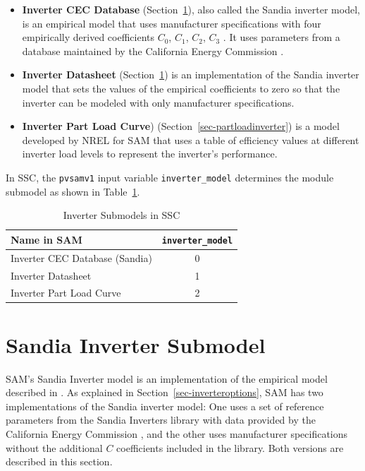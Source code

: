 \documentclass[12pt,letterpaper]{article}
\begin{document}
\begin{itemize}
\item \textbf{Inverter CEC Database} (Section~\ref{sec-sandiainverter}), also called the Sandia inverter model, is an empirical model that uses manufacturer specifications with four empirically derived coefficients $C_0$, $C_1$, $C_2$, $C_3$ \citep{king2007}. It uses parameters from a database maintained by the California Energy Commission \citep{gsc2014a}.
\item \textbf{Inverter Datasheet} (Section~\ref{sec-sandiainverter}) is an implementation of the Sandia inverter model that sets the values of the empirical coefficients to zero so that the inverter can be modeled with only manufacturer specifications.
\item \textbf{Inverter Part Load Curve}) (Section~\ref{sec-partloadinverter}) is a model developed by NREL for SAM that uses a table of efficiency values at different inverter load levels to represent the inverter's performance.
\end{itemize}

In SSC, the \texttt{pvsamv1} input variable \texttt{inverter\_model} determines the module submodel as shown in Table~\ref{tab-invertersubmodels}.

\begin{table}
\begin{center}
\caption{Inverter Submodels in SSC}
\begin{tabular}{lc}
\midrule
Name in SAM & \texttt{inverter\_model} \\
\midrule
Inverter CEC Database (Sandia) & 0 \\
Inverter Datasheet & 1 \\
Inverter Part Load Curve & 2 \\
\hline
\end{tabular}
\label{tab-invertersubmodels}
\end{center}
\end{table}

\section{Sandia Inverter Submodel}\label{sec-sandiainverter}

SAM's Sandia Inverter model is an implementation of the empirical model described in \citet{king2007}. As explained in Section~\ref{sec-inverteroptions}, SAM has two implementations of the Sandia inverter model: One uses  a set of reference parameters from the Sandia Inverters library with data provided by the California Energy Commission \citep{gsc2014a}, and the other uses manufacturer specifications without the additional $C$ coefficients included in the library. Both versions are described in this section.
\end{document}
